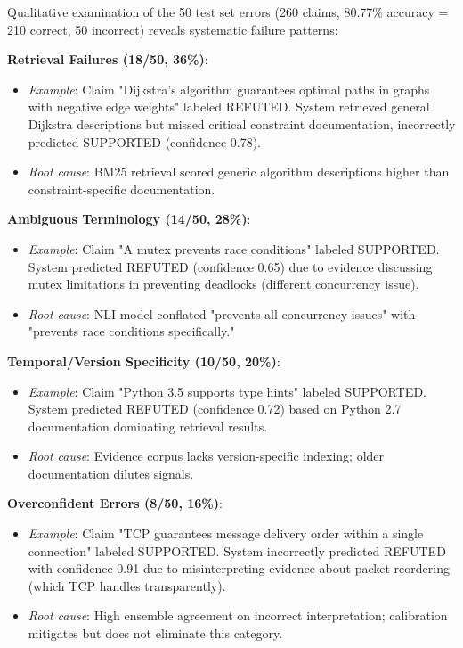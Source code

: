 \documentclass[journal]{IEEEtran}
\begin{document}
Qualitative examination of the 50 test set errors (260 claims, 80.77\% accuracy = 210 correct, 50 incorrect) reveals systematic failure patterns:

\textbf{Retrieval Failures (18/50, 36\%)}:
\begin{itemize}
    \item \textit{Example}: Claim "Dijkstra's algorithm guarantees optimal paths in graphs with negative edge weights" labeled REFUTED. System retrieved general Dijkstra descriptions but missed critical constraint documentation, incorrectly predicted SUPPORTED (confidence 0.78).
    \item \textit{Root cause}: BM25 retrieval scored generic algorithm descriptions higher than constraint-specific documentation.
\end{itemize}

\textbf{Ambiguous Terminology (14/50, 28\%)}:
\begin{itemize}
    \item \textit{Example}: Claim "A mutex prevents race conditions" labeled SUPPORTED. System predicted REFUTED (confidence 0.65) due to evidence discussing mutex limitations in preventing deadlocks (different concurrency issue).
    \item \textit{Root cause}: NLI model conflated "prevents all concurrency issues" with "prevents race conditions specifically."
\end{itemize}

\textbf{Temporal/Version Specificity (10/50, 20\%)}:
\begin{itemize}
    \item \textit{Example}: Claim "Python 3.5 supports type hints" labeled SUPPORTED. System predicted REFUTED (confidence 0.72) based on Python 2.7 documentation dominating retrieval results.
    \item \textit{Root cause}: Evidence corpus lacks version-specific indexing; older documentation dilutes signals.
\end{itemize}

\textbf{Overconfident Errors (8/50, 16\%)}:
\begin{itemize}
    \item \textit{Example}: Claim "TCP guarantees message delivery order within a single connection" labeled SUPPORTED. System incorrectly predicted REFUTED with confidence 0.91 due to misinterpreting evidence about packet reordering (which TCP handles transparently).
    \item \textit{Root cause}: High ensemble agreement on incorrect interpretation; calibration mitigates but does not eliminate this category.
\end{itemize}
\end{document}
